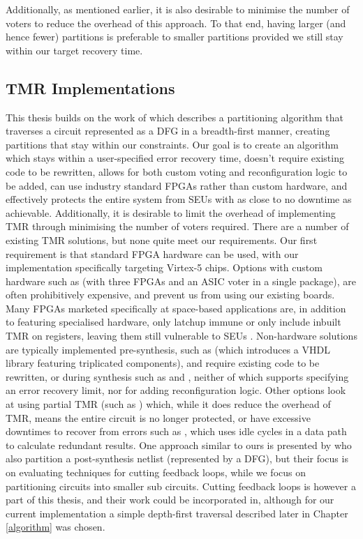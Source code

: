 \documentclass[12pt,final,oneside,a4paper]{dwThesis} %
\begin{document}
   Additionally, as mentioned earlier, it is also desirable to minimise the
   number of voters to reduce the overhead of this approach. To that end,
   having larger (and hence fewer) partitions is preferable to smaller
   partitions provided we still stay within our target recovery time.

   \subsection{\gls{TMR}
      Implementations} This thesis builds on the
   work of\cite{DiesselChange} which describes a partitioning algorithm that
   traverses a circuit represented as a \gls{DFG} in a breadth-first manner,
   creating partitions that stay within our constraints.  Our goal is to create an
   algorithm which stays within a user-specified error recovery time, doesn't
   require existing code to be rewritten, allows for both custom voting and
   reconfiguration logic to be added, can use industry standard \glspl{FPGA}
   rather than custom hardware, and effectively protects the entire system from
   \glspl{SEU} with as close to no downtime as achievable.  Additionally, it is
   desirable to limit the overhead of implementing \gls{TMR} through minimising
   the number of voters required.  There are a number of existing \gls{TMR}
   solutions, but none quite meet our requirements.  Our first requirement is
   that standard \gls{FPGA} hardware can be used, with our implementation
   specifically targeting Virtex-5 chips. Options with custom hardware such as
   \cite{VFPGATMR} (with three \glspl{FPGA} and an \gls{ASIC} voter in a single
   package), are often prohibitively expensive, and prevent us from using our
   existing boards.  Many \glspl{FPGA} marketed specifically at space-based
   applications are, in addition to featuring specialised hardware, only
   latchup immune or only include inbuilt \gls{TMR} on registers,
   leaving them still vulnerable to \glspl{SEU} \cite{FPGAReview}.  Non-hardware
   solutions are typically implemented pre-synthesis, such as \cite{ftmr} (which
   introduces a \gls{VHDL} library featuring triplicated components), and require
   existing code to be rewritten, or during synthesis such as \cite{synplify} and
   \cite{tmrtool}, neither of which supports specifying an error recovery limit, nor
   for adding reconfiguration logic.  Other options look at using partial
   \gls{TMR} (such as \cite{partialTMR}) which, while it does reduce the overhead
   of \gls{TMR}, means the entire circuit is no longer protected, or have
   excessive downtimes to recover from errors such as \cite{VTMR}, which uses idle
   cycles in a data path to calculate redundant results.  One approach similar to
   ours is presented by \cite{PostSynth} who also partition a post-synthesis
   netlist (represented by a \gls{DFG}), but their focus is on evaluating
   techniques for cutting feedback loops, while we focus on partitioning circuits
   into smaller sub circuits. Cutting feedback loops is however a part of this
   thesis, and their work could be incorporated in, although for our current
   implementation a simple depth-first traversal described later in Chapter \ref{algorithm} was chosen.
\end{document}
